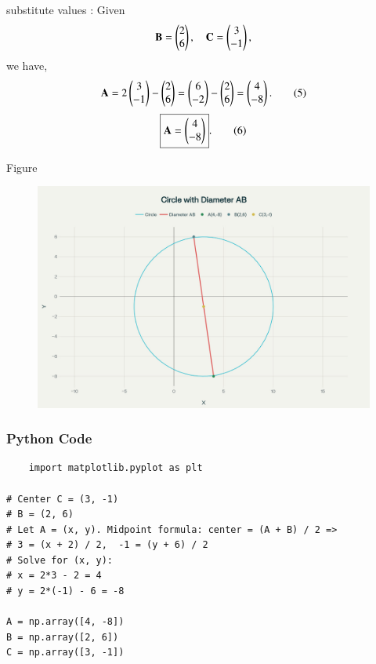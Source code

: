 \documentclass{beamer}
\begin{document}
\begin{frame}{substitute values :}
 Given
\[
\mathbf{B} = \begin{pmatrix}2 \\ 6\end{pmatrix}, \quad \mathbf{C} = \begin{pmatrix}3 \\ -1\end{pmatrix},
\]
we have,
\begin{equation}

\vec{A} = 2 \myvec{3 \\ -1} - \myvec{2 \\ 6} = \myvec{6 \\ -2} - \myvec{2 \\ 6} = \myvec{4 \\ -8}.

\tag{5}
\end{equation}
\bigskip
\begin{equation}

\boxed{\vec{A} = \myvec{4 \\ -8}}.

\tag{6}
\end{equation}
\end{frame}

\begin{frame}{Figure}
  
\begin{figure}[H]
    \centering
    \includegraphics[width=0.5\linewidth]{figs/fig.png}
    \caption{}
    \label{fig:placeholder}
\end{figure}
  
\end{frame}

\begin{frame}[fragile]
    \frametitle{Python Code}
    \begin{lstlisting}
    import matplotlib.pyplot as plt

# Center C = (3, -1)
# B = (2, 6)
# Let A = (x, y). Midpoint formula: center = (A + B) / 2 =>
# 3 = (x + 2) / 2,  -1 = (y + 6) / 2
# Solve for (x, y):
# x = 2*3 - 2 = 4
# y = 2*(-1) - 6 = -8

A = np.array([4, -8])
B = np.array([2, 6])
C = np.array([3, -1])
\end{lstlisting}
\end{frame}
\end{document}

